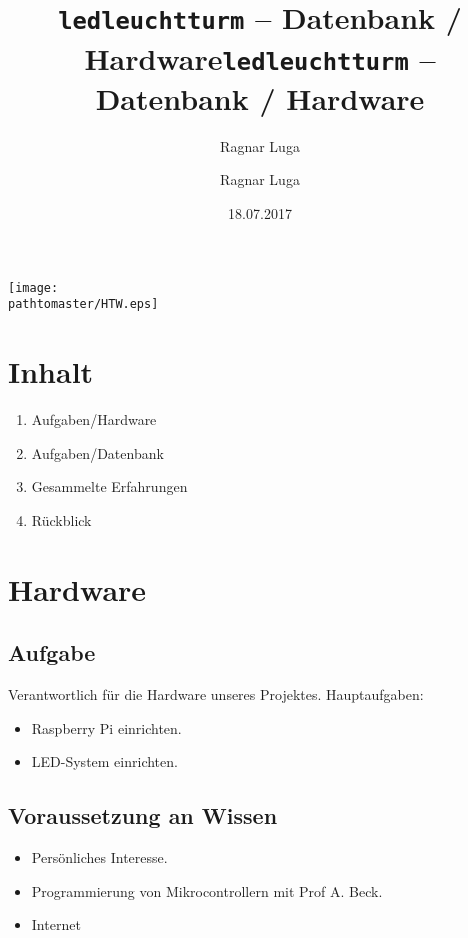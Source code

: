 \documentclass[ignorenonframetext, 11pt, table]{beamer}
\author{Ragnar Luga}
\title{\texttt{ledleuchtturm} -- Datenbank / Hardware}
\date{18.07.2017}
\gdef\pathtomaster{../_LaTeX_master}
\begin{document}
\author{Ragnar Luga}
\title{\texttt{ledleuchtturm} -- Datenbank / Hardware}

\begin{frame}[plain]
\begin{center}
\texttt{[image: \\pathtomaster/HTW.eps]}
\end{center}
\maketitle
\end{frame}

\section{Inhalt}
\begin{frame}
\begin{enumerate}
\setlength\itemsep{0.2em}
\item Aufgaben/Hardware \pause 
\item Aufgaben/Datenbank \pause
\item Gesammelte Erfahrungen \pause
\item Rückblick
\end{enumerate}
\end{frame}

\section{Hardware}
\subsection{Aufgabe}
\begin{frame}
Verantwortlich für die Hardware unseres Projektes.\pause
\newline\newline
Hauptaufgaben:
\begin{itemize}
\item Raspberry Pi einrichten.\pause
\item LED-System einrichten.
\end{itemize}
\end{frame}

\subsection{Voraussetzung an Wissen}
\begin{frame}
\begin{itemize}
\item Persönliches Interesse. \pause
\item Programmierung von Mikrocontrollern mit Prof A. Beck. \pause
\item Internet
\end{itemize}
\end{frame}
\end{document}
